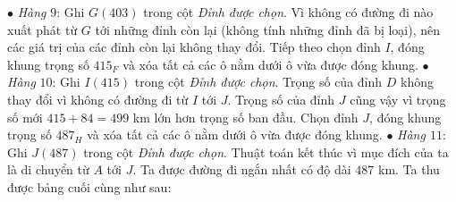 \begin{multicols}{2}
	\vskip 0.1cm
	$\bullet$ \textit{Hàng} $9$: Ghi $G(403)$ trong cột \textit{Đỉnh được chọn}. Vì không có đường đi nào xuất phát từ $G$ tới những đỉnh còn lại (không tính những đỉnh đã bị loại), nên các giá trị của các đỉnh còn lại không thay đổi. Tiếp theo chọn đỉnh $I$, đóng khung trọng số $415_F$ và xóa tất cả các ô nằm dưới ô vừa được đóng khung. 
	\vskip 0.1cm
	$\bullet$ \textit{Hàng} $10$: Ghi $I(415)$ trong cột \textit{Đỉnh được chọn}. Trọng số của đỉnh $D$ không thay đổi vì không có đường đi từ $I$ tới $J$. Trọng số của đỉnh $J$ cũng vậy vì trọng số mới $415+84=499$ km lớn hơn trọng số ban đầu.  Chọn đỉnh $J$, đóng khung trọng số $487_H$ và xóa tất cả các ô nằm dưới ô vừa được đóng khung.
	\vskip 0.1cm 
	$\bullet$ \textit{Hàng $11$}: Ghi $J(487)$ trong cột \textit{Đỉnh được chọn}. Thuật toán kết thúc vì mục đích của ta là di chuyển từ $A$ tới $J$.  Ta được đường đi ngắn nhất có độ dài $487$ km. 
	\vskip 0.1cm
	Ta thu được bảng cuối cùng như sau:
	\begin{table}[H]
		\vspace*{-5pt}
		\centering
		\captionsetup{labelformat= empty, justification=centering}
\end{table}
\end{multicols}

